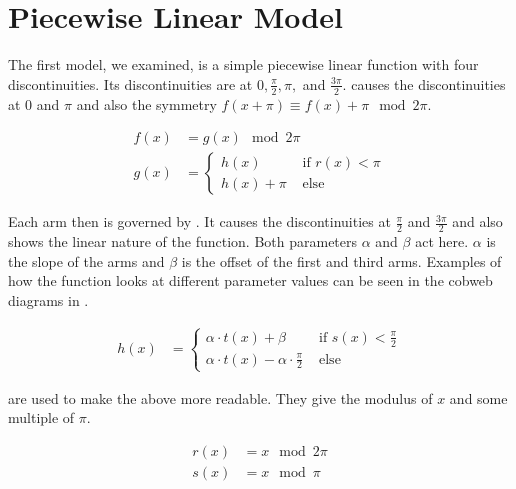 \section{Piecewise Linear Model}

The first model, we examined, is a simple piecewise linear function with four discontinuities.
Its discontinuities are at $0, \frac{\pi}{2}, \pi,$ and $\frac{3 \pi}{2}$.
 causes the discontinuities at $0$ and $\pi$ and also the symmetry $f(x + \pi) \equiv f(x) + \pi \mod 2 \pi$.

\begin{align}
    f(x) & = g(x) \mod 2 \pi \label{equ:pcw.lin.f} \\
    g(x) & = \begin{cases}
        h(x) & \text{ if } r(x) < \pi \\
        h(x) + \pi & \text{ else}
    \end{cases} \label{equ:pcw.lin.sympi}
\end{align}

Each arm then is governed by .
It causes the discontinuities at $\frac{\pi}{2}$ and $\frac{3 \pi}{2}$ and also shows the linear nature of the function.
Both parameters $\alpha$ and $\beta$ act here.
$\alpha$ is the slope of the arms and $\beta$ is the offset of the first and third arms.
Examples of how the function looks at different parameter values can be seen in the cobweb diagrams in .

\begin{align}
    h(x) & = \begin{cases}
        \alpha \cdot t(x) + \beta & \text{ if } s(x) < \frac{\pi}{2} \\
        \alpha \cdot t(x) - \alpha \cdot \frac{\pi}{2} & \text{ else}
    \end{cases} \label{equ:pcw.lin.discpihalves}
\end{align}

 are used to make the above more readable.
They give the modulus of $x$ and some multiple of $\pi$.

\begin{align}
    r(x) & = x \mod 2 \pi \label{equ:pcw.lin.r} \\
    s(x) & = x \mod \pi \label{equ:pcw.lin.s}
\end{align}





